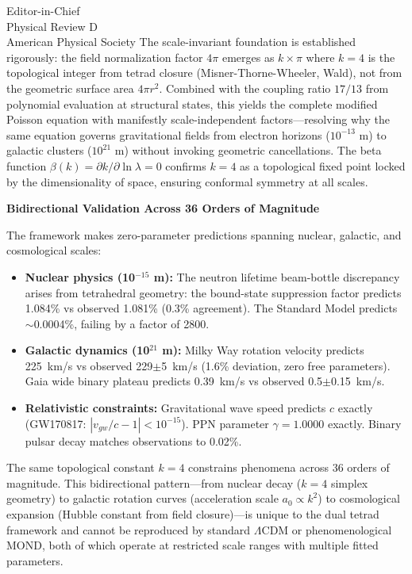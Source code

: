 \documentclass[11pt]{letter}
\begin{document}
\begin{letter}{%
Editor-in-Chief\\
Physical Review D\\
American Physical Society
}
The scale-invariant foundation is established rigorously: the field normalization factor $4\pi$ emerges as $k \times \pi$ where $k=4$ is the topological integer from tetrad closure (Misner-Thorne-Wheeler, Wald), not from the geometric surface area $4\pi r^2$. Combined with the coupling ratio $17/13$ from polynomial evaluation at structural states, this yields the complete modified Poisson equation with manifestly scale-independent factors—resolving why the same equation governs gravitational fields from electron horizons ($10^{-13}$ m) to galactic clusters ($10^{21}$ m) without invoking geometric cancellations. The beta function $\beta(k) = \partial k/\partial \ln \lambda = 0$ confirms $k=4$ as a topological fixed point locked by the dimensionality of space, ensuring conformal symmetry at all scales.

\textbf{Bidirectional Validation Across 36 Orders of Magnitude}

The framework makes zero-parameter predictions spanning nuclear, galactic, and cosmological scales:

\begin{itemize}
\item \textbf{Nuclear physics (10$^{-15}$ m):} The neutron lifetime beam-bottle discrepancy arises from tetrahedral geometry: the bound-state suppression factor predicts 1.084\% vs observed 1.081\% (0.3\% agreement). The Standard Model predicts $\sim$0.0004\%, failing by a factor of 2800.

\item \textbf{Galactic dynamics (10$^{21}$ m):} Milky Way rotation velocity predicts 225~km/s vs observed 229$\pm$5~km/s (1.6\% deviation, zero free parameters). Gaia wide binary plateau predicts 0.39~km/s vs observed 0.5$\pm$0.15~km/s.

\item \textbf{Relativistic constraints:} Gravitational wave speed predicts $c$ exactly (GW170817: $|v_{gw}/c - 1| < 10^{-15}$). PPN parameter $\gamma = 1.0000$ exactly. Binary pulsar decay matches observations to 0.02\%.
\end{itemize}

The same topological constant $k = 4$ constrains phenomena across 36 orders of magnitude. This bidirectional pattern—from nuclear decay ($k = 4$ simplex geometry) to galactic rotation curves (acceleration scale $a_0 \propto k^2$) to cosmological expansion (Hubble constant from field closure)—is unique to the dual tetrad framework and cannot be reproduced by standard $\Lambda$CDM or phenomenological MOND, both of which operate at restricted scale ranges with multiple fitted parameters.


\end{letter}
\end{document}
